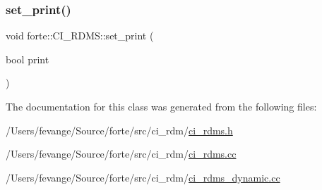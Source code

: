\subsubsection{\texorpdfstring{set\+\_\+print()}{set\_print()}}
{\footnotesize\ttfamily void forte\+::\+C\+I\+\_\+\+R\+D\+M\+S\+::set\+\_\+print (\begin{DoxyParamCaption}\item[{bool}]{print }\end{DoxyParamCaption})\hspace{0.3cm}{\ttfamily [inline]}}



The documentation for this class was generated from the following files\+:\begin{DoxyCompactItemize}
\item 
/\+Users/fevange/\+Source/forte/src/ci\+\_\+rdm/\mbox{\hyperlink{ci__rdms_8h}{ci\+\_\+rdms.\+h}}\item 
/\+Users/fevange/\+Source/forte/src/ci\+\_\+rdm/\mbox{\hyperlink{ci__rdms_8cc}{ci\+\_\+rdms.\+cc}}\item 
/\+Users/fevange/\+Source/forte/src/ci\+\_\+rdm/\mbox{\hyperlink{ci__rdms__dynamic_8cc}{ci\+\_\+rdms\+\_\+dynamic.\+cc}}\end{DoxyCompactItemize}

